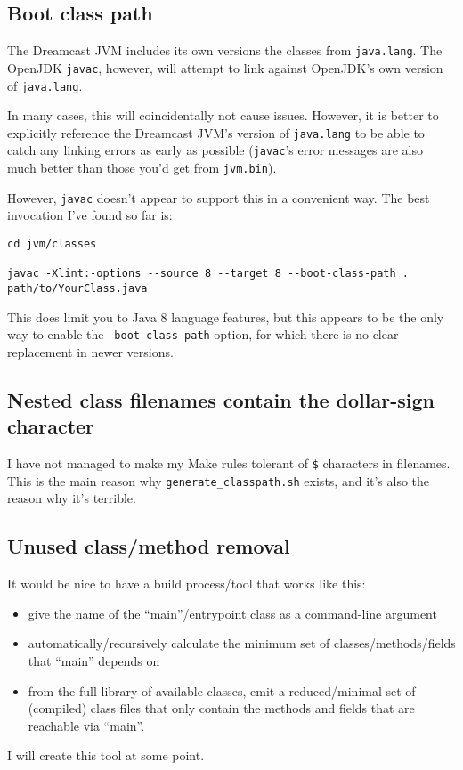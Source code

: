 \documentclass[20pt]{article}
\begin{document}
\subsection{Boot class path}

The Dreamcast JVM includes its own versions the classes from
\texttt{java.lang}. The OpenJDK \texttt{javac}, however, will attempt to link
against OpenJDK's own version of \texttt{java.lang}.

In many cases, this will coincidentally not cause issues. However, it is better
to explicitly reference the Dreamcast JVM's version of \texttt{java.lang} to be
able to catch any linking errors as early as possible (\texttt{javac}'s error
messages are also much better than those you'd get from \texttt{jvm.bin}).

However, \texttt{javac} doesn't appear to support this in a convenient way. The
best invocation I've found so far is:

\begin{verbatim}
cd jvm/classes

javac -Xlint:-options --source 8 --target 8 --boot-class-path . path/to/YourClass.java
\end{verbatim}

This does limit you to Java 8 language features, but this appears to be the only
way to enable the \texttt{--boot-class-path} option, for which there is no clear
replacement in newer versions.

\subsection{Nested class filenames contain the dollar-sign character}

I have not managed to make my Make rules tolerant of \texttt{\$} characters in
filenames. This is the main reason why \texttt{generate\_classpath.sh} exists,
and it's also the reason why it's terrible.

\subsection{Unused class/method removal}

It would be nice to have a build process/tool that works like this:

\begin{itemize}
\item give the name of the ``main''/entrypoint class as a command-line argument
\item automatically/recursively calculate the minimum set of
  classes/methods/fields that ``main'' depends on
\item from the full library of available classes, emit a reduced/minimal set of
  (compiled) class files that only contain the methods and fields that are
  reachable via ``main''.
\end{itemize}

I will create this tool at some point.
\end{document}
